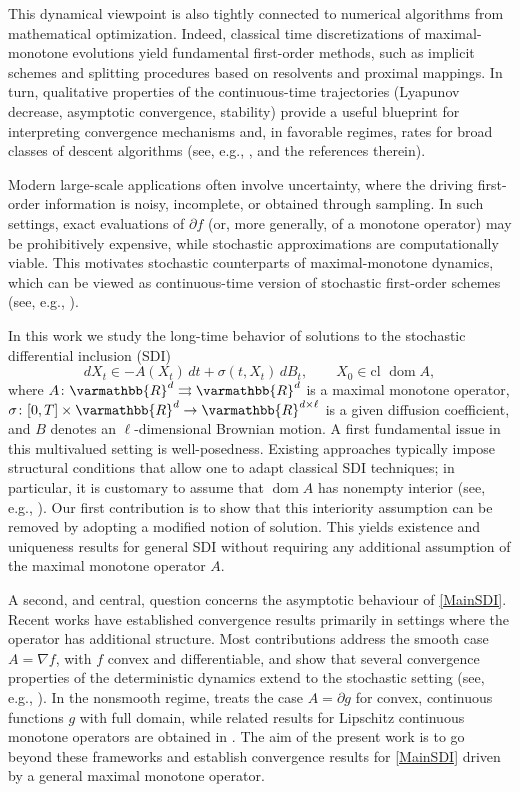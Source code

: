 \documentclass[11pt,reqno]{article}
\let\mathbb=\varmathbb
\newcommand{\R}{\mathbb{R}}
\newcommand{\dom}{\operatorname{dom}}
\newcommand{\cl}{{\text{cl }}}
\newcommand{\1}{\mathds{1}}
\numberwithin{equation}{section}  %
\theoremstyle{plain}
\theoremstyle{definition}
\theoremstyle{remark}
\numberwithin{theorem}{section}
\numberwithin{remark}{section}
\numberwithin{example}{section}
\begin{document}
This dynamical viewpoint is also tightly connected to numerical algorithms from mathematical optimization. Indeed, classical time discretizations of
maximal-monotone evolutions yield fundamental first-order methods, such as implicit schemes and splitting procedures
based on resolvents and proximal mappings. In turn, qualitative properties of the continuous-time trajectories
(Lyapunov decrease, asymptotic convergence, stability) provide a useful blueprint for interpreting convergence
mechanisms and, in favorable regimes, rates for broad classes of descent algorithms (see, e.g.,
\cite{MR1398330,MR2593044}, and the references therein).

Modern large-scale applications often involve uncertainty, where the driving first-order information is noisy,
incomplete, or obtained through sampling. In such settings, exact evaluations of $\partial f$ (or, more generally, of a
monotone operator) may be prohibitively expensive, while stochastic approximations are computationally viable.
This motivates stochastic counterparts of maximal-monotone dynamics, which can be viewed as continuous-time version
of stochastic first-order schemes (see, e.g., \cite{MR3361444}).

In this work we study the long-time behavior of solutions to the stochastic differential inclusion (SDI)
\begin{equation}\label{MainSDI}
    dX_t \in -A(X_t)\,dt + \sigma(t,X_t)\,dB_t, 
    \qquad X_0 \in \cl \dom A,
\end{equation}
where $A\colon\R^d\rightrightarrows\R^d$ is a maximal monotone operator, $\sigma\colon [0,T]\times \R^d \to \R^{d\times\ell}$
is a given diffusion coefficient, and $B$ denotes an $\ell$-dimensional Brownian motion.
A first fundamental issue in this multivalued setting is well-posedness. Existing approaches typically impose structural
conditions that allow one to adapt classical SDI techniques; in particular, it is customary to assume that $\dom A$ has
nonempty interior (see, e.g., \cite{MR1442017,MR1626174,MR2380366}).
Our first contribution is to show that this interiority assumption can be removed by adopting a modified notion of
solution. This yields existence and uniqueness results for general SDI without requiring any additional assumption of the maximal monotone operator $A$.

A second, and central, question concerns the asymptotic behaviour of \eqref{MainSDI}.
Recent works have established convergence results primarily in settings where the operator has additional structure.
Most contributions address the smooth case $A=\nabla f$, with $f$ convex and differentiable, and show that several
convergence properties of the deterministic dynamics extend to the stochastic setting (see, e.g.,
\cite{MR3747470,MR4989859}).
In the nonsmooth regime, \cite{MR4991707} treats the case $A=\partial g$ for convex, continuous
functions $g$ with full domain, while related results for Lipschitz continuous monotone operators are obtained in
\cite{MR4845874}. The aim of the present work is to go beyond these frameworks and establish convergence results
for \eqref{MainSDI} driven by a general maximal monotone operator.
\end{document}

